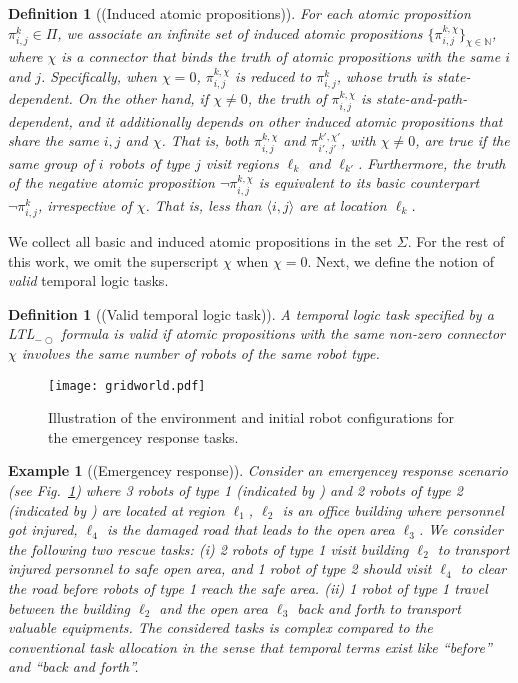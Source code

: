 \documentclass[Afour,sageh,times]{sagej}
\newtheorem{exmp}{Example}
\newtheorem{defn}[thm]{Definition}
\newcommand{\ltl}{ {\it LTL}$_{-\bigcirc}$ }
\newcommand{\ag}[2]{\langle#1,#2\rangle}
\renewcommand{\ap}[3]{\mathcal{\pi}_{{#1},{#2}}^{#3}}
\newlength\myheight
\newlength\mydepth
\newcommand*\inlinegraphics[1]{%
  \settototalheight\myheight{Xygp}%
  \settodepth\mydepth{Xygp}%
  \raisebox{-0.7\mydepth}{\texttt{[image: \#1]}}%
}
\begin{document}
\begin{defn}[(Induced atomic propositions)]
   For each atomic proposition $\ap{i}{j}{k} \in \Pi$, we associate an infinite set of  {induced} atomic propositions $\{\ap{i}{j}{k,\chi}\}_{\chi\in \mathbb{N}}$, where $\chi$ is a {\it connector} that binds the truth of  atomic propositions with the same $i$ and $j$. Specifically, when $\chi=0$, $\ap{i}{j}{k,\chi}$ is reduced to $\ap{i}{j}{k}$, whose truth is state-dependent. On the other hand, if $\chi \neq 0$, the truth of $\ap{i}{j}{k,\chi}$ is state-and-path-dependent, and it additionally depends on other induced atomic propositions that share the same $i,j$ and $\chi$. That is, both $\ap{i}{j}{k,\chi}$ and $\ap{i'}{j'}{k',\chi'}$, with $\chi\not=0$, are true if the same group of $i$ robots of type $j$ visit regions $\ell_k$ and $\ell_{k'}$. Furthermore, the truth of the negative atomic proposition  $\neg \ap{i}{j}{k,\chi}$ is equivalent to its basic counterpart $\neg \ap{i}{j}{k}$, irrespective of  $\chi$. That is, less than $\ag{i}{j}$ are at location $\ell_k$.
 \end{defn}

We collect all basic and induced atomic propositions in the set $\Sigma$.  For the rest of this work, we omit the superscript $\chi$ when $\chi=0$. Next, we define the notion of {\it valid} temporal logic tasks.
 \begin{defn}[(Valid temporal logic task)]
A temporal logic task specified by a\ltl formula is valid if atomic propositions with the same non-zero connector $\chi$ involves the same number of robots of the same robot type.
 \end{defn}

 \begin{figure}[!t]
    \centering
    \texttt{[image: gridworld.pdf]}
    \caption{Illustration of the environment and initial robot configurations for the emergencey response tasks.}\label{fig:workspace}
\end{figure}
\begin{exmp}[(Emergencey response)]\label{exmp:1}
  Consider an emergencey response scenario (see Fig.~\ref{fig:workspace}) where 3 robots of type 1 (indicated by \inlinegraphics{star.pdf}) and 2 robots of type 2 (indicated by \inlinegraphics{bluedot.pdf}) are located at region $\ell_1$, $\ell_2$ is an office building where personnel got injured, $\ell_4$ is the damaged road that leads to the open area $\ell_3$. We consider the following two rescue tasks: {\it (i)} \label{task:i} 2 robots of type 1 visit building $\ell_2$ to transport injured personnel to safe open area, and 1 robot of type 2 should visit $\ell_4$ to clear the road before robots of type 1 reach the safe area. {\it (ii)} \label{task:ii} 1 robot of type 1 travel between the building $\ell_2$ and the open area $\ell_3$ back and forth to transport valuable equipments. The considered tasks is complex compared to the conventional task allocation  in the sense that temporal terms exist like ``before'' and ``back and forth''.
\end{exmp}
\end{document}
